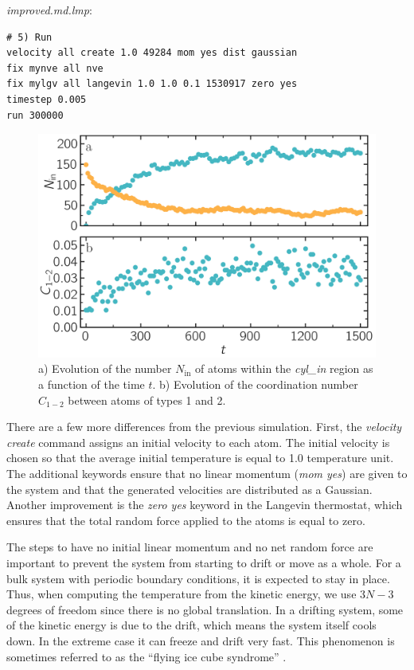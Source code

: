 \documentclass[9pt,tutorial]{livecoms}
\begin{document}
\textit{improved.md.lmp}:
\begin{lstlisting}
# 5) Run
velocity all create 1.0 49284 mom yes dist gaussian
fix mynve all nve
fix mylgv all langevin 1.0 1.0 0.1 1530917 zero yes
timestep 0.005
run 300000
\end{lstlisting}

\begin{figure}
\centering
\includegraphics[width=\linewidth]{LJ-mixing}
\caption{a) Evolution of the number $N_\text{in}$ of atoms within the
\textit{cyl\_in} region as a function of the time $t$. b) Evolution of
the coordination number $C_{1-2}$ between atoms of types 1 and 2.}
\label{fig:mixing}
\end{figure}

There are a few more differences from the previous simulation.  First,
the \textit{velocity create} command assigns an initial velocity to each
atom.  The initial velocity is chosen so that the average initial
temperature is equal to 1.0 temperature unit.  The additional keywords
ensure that no linear momentum (\textit{mom yes}) are given to the
system and that the generated velocities are distributed as a Gaussian.
Another improvement is the \textit{zero yes} keyword in the Langevin
thermostat, which ensures that the total random force applied to the
atoms is equal to zero.

The steps to have no initial linear momentum and no net random force are
important to prevent the system from starting to drift or move as a
whole.  For a bulk system with periodic boundary conditions, it is
expected to stay in place. Thus, when computing the temperature from the
kinetic energy, we use $3N-3$ degrees of freedom since there is no
global translation.  In a drifting system, some of the kinetic energy is
due to the drift, which means the system itself cools down.  In the
extreme case it can freeze and drift very fast. This phenomenon is
sometimes referred to as the ``flying ice cube syndrome''
\cite{wong2016good}.
\end{document}
